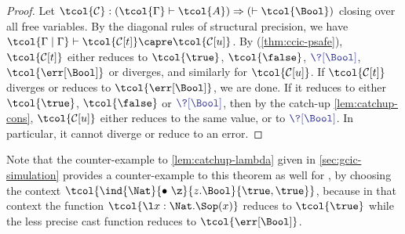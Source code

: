\begin{proof}
  Let $\tcol{\mathcal{C}} : (\tcol{\Gamma} \vdash \tcol{A}) \Rightarrow (\vdash \tcol{\Bool})$
  closing over all free variables.
  By the diagonal rules of structural precision, we have
  $\tcol{\Gamma \mid \Gamma} \vdash \tcol{\mathcal{C}[t]} \capre \tcol{\mathcal{C}[u]}$.
  By  (\cref{thm:ccic-psafe}), $\tcol{\mathcal{C}[t]}$ either reduces
  to $\tcol{\true}$, $\tcol{\false}$, $\tcol{\?[\Bool]}$, $\tcol{\err[\Bool]}$ or diverges, and similarly for $\tcol{\mathcal{C}[u]}$.
  If $\tcol{\mathcal{C}[t]}$ diverges or reduces to $\tcol{\err[\Bool]}$, we are done.
  If it reduces to either $\tcol{\true}$, $\tcol{\false}$ or $\tcol{\?[\Bool]}$,
  then by the catch-up \cref{lem:catchup-cons},
  $\tcol{\mathcal{C}[u]}$ either reduces to the same value, or
  to $\tcol{\?[\Bool]}$.
  In particular, it cannot diverge or reduce to an error.
\end{proof}

Note that the counter-example to \cref{lem:catchup-lambda} given in
\cref{sec:gcic-simulation} provides a counter-example to this theorem as well for ,
by choosing the context $\tcol{\ind{\Nat}{\bullet~\z}{z.\Bool}{\true,\true}}$,
because in that context the function $\tcol{\l x : \Nat . \S x}$ reduces to $\tcol{\true}$ while the less precise cast function reduces to $\tcol{\err[\Bool]}$.